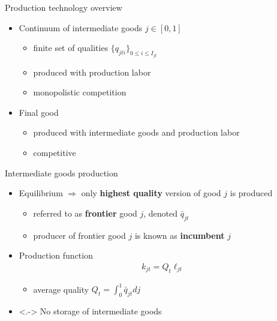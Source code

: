 \documentclass[english,usenames,dvipsnames]{beamer}
\begin{document}
\begin{frame}{Production technology overview}
	\begin{itemize}
		\item Continuum of intermediate goods $j \in [0,1]$ 
		\begin{itemize}
			\item finite set of qualities $\{q_{jti}\}_{0 \le i \le I_{jt}}$
			\item produced with production labor 
			\item monopolistic competition
		\end{itemize}
		\smallskip
		\item Final good
		\begin{itemize}
			\item produced with intermediate goods and production labor
			\item competitive
		\end{itemize}
	\end{itemize}
\end{frame}

\begin{frame}{Intermediate goods production}\label{intermediate_goods_production}
	\begin{itemize}
		\item<+-> Equilibrium $\Rightarrow$ only \alert{\textbf{highest quality}} version of good $j$ is produced \hyperlink{two_stage_bertrand2}{}
		\begin{itemize}
			\item referred to as \alert{\textbf{frontier}} good $j$, denoted $\bar{q}_{jt}$
			\item producer of frontier good $j$ is known as  \alert{\textbf{incumbent}} $j$ 
		\end{itemize}
		\medskip
		\item<+-> Production function
		\begin{align*}
		k_{jt} = Q_t \ell_{jt}
		\end{align*}
		\begin{itemize}
			\item average quality $Q_t = \int_0^1 \bar{q}_{jt} dj$
		\end{itemize}
		\medskip
		\item<.-> No storage of intermediate goods 
	\end{itemize}
\end{frame}
\end{document}
